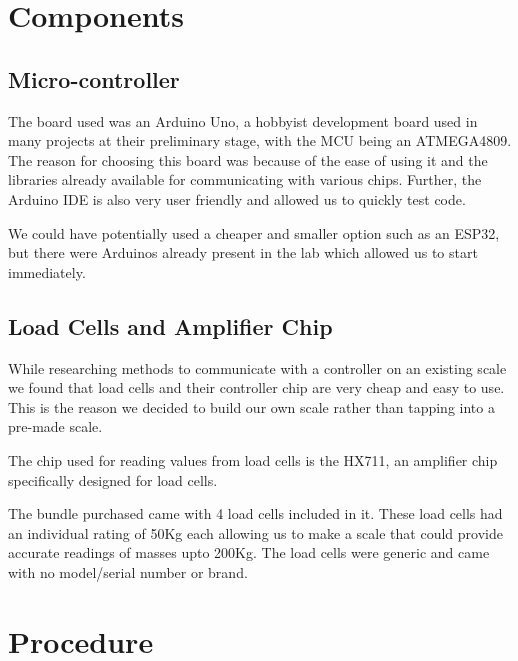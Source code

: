 \documentclass[10pt]{article}
\begin{document}
{\Large\section{Components}\par}
{\large\subsection{Micro-controller}\par}
{\large
The board used was an Arduino Uno, a hobbyist development board used in many projects at their preliminary stage, with the MCU being an ATMEGA4809. The reason for choosing this board was because of the ease of using it and the libraries already available for communicating with various chips. Further, the Arduino IDE is also very user friendly and allowed us to quickly test code.

We could have potentially used a cheaper and smaller option such as an ESP32, but there were Arduinos already present in the lab which allowed us to start immediately.

{\large\subsection{Load Cells and Amplifier Chip}\par}
While researching methods to communicate with a controller on an existing scale we found that load cells and their controller chip are very cheap and easy to use. This is the reason we decided to build our own scale rather than tapping into a pre-made scale.

The chip used for reading values from load cells is the HX711, an amplifier chip specifically designed for load cells.

The bundle purchased came with 4 load cells included in it. These load cells had an individual rating of 50Kg each allowing us to make a scale that could provide accurate readings of masses upto 200Kg. The load cells were generic and came with no model/serial number or brand.


\par}
{\newpage\Large\section{Procedure}\par}
\end{document}
